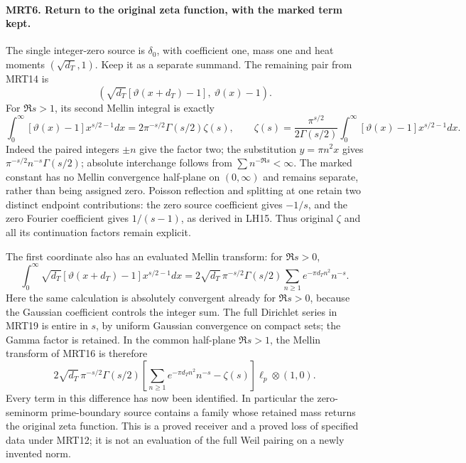 \paragraph{MRT6. Return to the original zeta function, with the marked term kept.}
The single integer-zero source is \(\delta_0\), with coefficient
one, mass one and heat moments \((\sqrt{d_T},1)\). Keep it
as a separate summand. The remaining pair from MRT14 is
\[
 \left(\sqrt{d_T}[\vartheta(x+d_T)-1],\ \vartheta(x)-1\right).
                                                               \tag{MRT17}
\]
For \(\Re s>1\), its second Mellin integral is exactly
\[
 \int_0^\infty[\vartheta(x)-1]x^{s/2-1}dx
   =2\pi^{-s/2}\Gamma(s/2)\zeta(s),\qquad
 \zeta(s)=\frac{\pi^{s/2}}{2\Gamma(s/2)}
                \int_0^\infty[\vartheta(x)-1]x^{s/2-1}dx.
                                                               \tag{MRT18}
\]
Indeed the paired integers \(\pm n\) give the factor two;
the substitution \(y=\pi n^2x\) gives
\(\pi^{-s/2}n^{-s}\Gamma(s/2)\); absolute interchange follows
from \(\sum n^{-\Re s}<\infty\). The marked constant has
no Mellin convergence half-plane on \((0,\infty)\) and remains
separate, rather than being assigned zero. Poisson reflection and
splitting at one retain two distinct endpoint contributions: the
zero source coefficient gives \(-1/s\), and the zero Fourier
coefficient gives \(1/(s-1)\), as derived in LH15. Thus original \(\zeta\)
and all its continuation factors remain explicit.

The first coordinate also has an evaluated Mellin transform:
for \(\Re s>0\),
\[
 \int_0^\infty\sqrt{d_T}[\vartheta(x+d_T)-1]x^{s/2-1}dx
  =2\sqrt{d_T}\,\pi^{-s/2}\Gamma(s/2)
         \sum_{n\ge1}e^{-\pi d_Tn^2}n^{-s}.                \tag{MRT19}
\]
Here the same calculation is absolutely convergent already for
\(\Re s>0\), because the Gaussian coefficient controls the
integer sum. The full Dirichlet series in MRT19 is entire in
\(s\), by uniform Gaussian convergence on compact sets; the
Gamma factor is retained. In the common half-plane \(\Re s>1\),
the Mellin transform of MRT16 is therefore
\[
 2\sqrt{d_T}\,\pi^{-s/2}\Gamma(s/2)
       \left[\sum_{n\ge1}e^{-\pi d_Tn^2}n^{-s}-\zeta(s)\right]
       \ell_p\otimes(1,0).                               \tag{MRT20}
\]
Every term in this difference has now been identified. In particular
the zero-seminorm prime-boundary source contains a family whose
retained mass returns the original zeta function. This is a proved
receiver and a proved loss of specified data under MRT12; it is
not an evaluation of the full Weil pairing on a newly invented norm.
